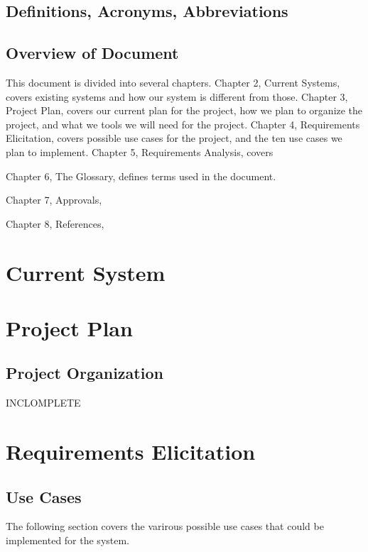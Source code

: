 \documentclass[letter,12pt]{report}
\begin{document}
\section{Definitions, Acronyms, Abbreviations}

\section{Overview of Document}
This document is divided into several chapters.
Chapter 2, Current Systems, covers existing systems and how our system
is different from those.
Chapter 3, Project Plan, covers our current plan for the project,
how we plan to organize the project, and what we tools we will need for the project.
Chapter 4, Requirements Elicitation, covers possible use cases for the project,
and the ten use cases we plan to implement.
Chapter 5, Requirements Analysis, covers

Chapter 6, The Glossary, defines terms used in the document.

Chapter 7, Approvals,

Chapter 8, References,

\chapter{Current System}

\chapter{Project Plan}

\section{Project Organization}
INCLOMPLETE


\newpage


\chapter{Requirements Elicitation}

\section{Use Cases}
The following section covers the varirous possible use cases
that could be implemented for the system.
\newpage

\newpage

\newpage
\end{document}
